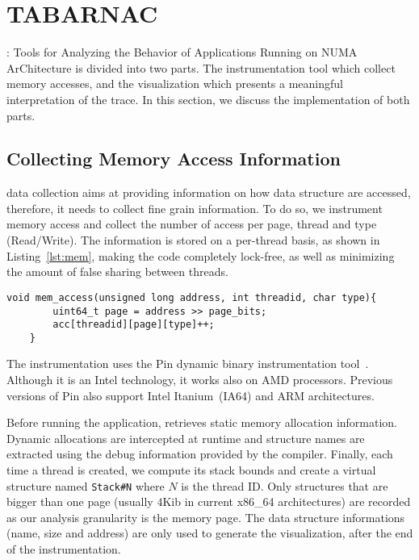 \newpage
\section{TABARNAC}
\label{sec:design}

\TABARNAC: Tools for Analyzing the Behavior of Applications Running on NUMA
ArChitecture is divided into two parts. The instrumentation tool which collect
memory accesses, and the visualization which presents a meaningful
interpretation of the trace.
In this section, we discuss the implementation of both parts.

\subsection{Collecting Memory Access Information}
\label{sec:design-impl}

\TABARNAC data collection aims at providing information on how data structure
are accessed, therefore, it needs to collect fine grain information. To do so,
we instrument memory access and collect the number of access per page, thread
and type (Read/Write). The information is stored on a per-thread basis, as
shown in Listing~\ref{lst:mem}, making the code completely lock-free, as well
as minimizing the amount of false sharing between threads.

\begin{lstlisting}[caption={Code executed on each memory access. Pin provides the \texttt{address}, \texttt{threadid} and \texttt{type} parameters.},label=lst:mem]
	void mem_access(unsigned long address, int threadid, char type){
		uint64_t page = address >> page_bits;
		acc[threadid][page][type]++;
	}
\end{lstlisting}

The instrumentation uses the Pin dynamic binary instrumentation
tool~\cite{Luk05Pin}. Although it is an Intel technology, it works also on AMD
processors.
Previous versions of Pin also support Intel Itanium~(IA64) and ARM architectures.

Before running the application, \TABARNAC retrieves static memory allocation
information. %
Dynamic allocations are intercepted at runtime and structure names
are extracted using the debug information provided by the compiler.
Finally, each time a thread is created, we compute its
stack bounds and create a virtual structure named \texttt{Stack\#N} where
$N$ is the thread ID. Only structures that are bigger than one page (usually
$4$Kib in current x86\_64 architectures) are recorded as our
analysis granularity is the memory page. The data structure informations (name,
size and address) are only used to generate the visualization, after the end
of the instrumentation.

